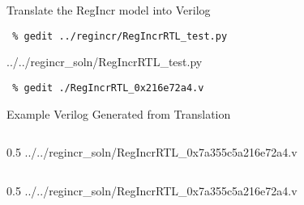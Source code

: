 \begin{task}\begin{frame}[fragile]{Translate the RegIncr model into Verilog}

\vspace{-0.15in}
\begin{Verbatim}[commandchars=\\\{\}]
 % cd    \midtilde/pymtl-tut/build
 % gedit ../regincr/RegIncrRTL_test.py
\end{Verbatim}
\vspace{-0.2in}

%
{../../regincr_soln/RegIncrRTL_test.py}

\vspace{-0.22in}
\begin{Verbatim}[commandchars=\\\{\}]
 % py.test ../regincr/RegIncrRTL_test.py -v --test-verilog
 % gedit ./RegIncrRTL_0x216e72a4.v
\end{Verbatim}

\end{frame}
\end{task}

\begin{frame}[fragile]{Example Verilog Generated from Translation}

\vspace{-0.25in}
\begin{cbxcols}

\begin{column}{0.5\tw}
%
{../../regincr_soln/RegIncrRTL_0x7a355c5a216e72a4.v}
\end{column}

\begin{column}{0.5\tw}
%
{../../regincr_soln/RegIncrRTL_0x7a355c5a216e72a4.v}
\end{column}

\end{cbxcols}
\end{frame}


